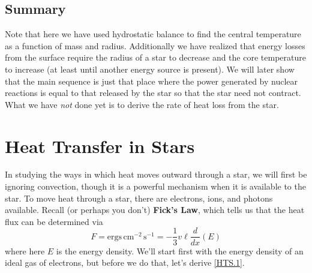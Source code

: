 \documentclass[10pt]{article}
\numberwithin{equation}{section}
\begin{document}
	\subsection{Summary}
		Note that here we have used hydrostatic balance to
                find the central temperature as a function of mass and
                radius. Additionally we have realized that energy
                losses from the surface require the radius of a star
                to decrease and the core temperature to increase (at
                least until another energy source is present). We will
                later show that the main sequence is just that place
                where the power generated by nuclear reactions is
                equal to that released by the star so that the star
                need not contract. What we have \emph{not} done yet is to 
derive the rate of heat loss from the star.
\section{Heat Transfer in Stars}
	In studying the ways in which heat moves outward through a star, we 
will first be ignoring convection, though it is a powerful mechanism when 
it is available to the star. To move heat through a star, there are 
electrons, ions, and photons available. Recall (or perhaps you don't) 
\textbf{Fick's Law}, which tells us that the heat flux can be determined 
via
	\begin{equation}
		\label{HTS.1} F=\mathrm{ergs\,cm^{-2}\,s^{-1}}=-\frac{1}{3}v\ell
\frac{d}{dx}(E)
	\end{equation}
	where here $E$ is the energy density. We'll start first with
        the energy density of an ideal gas of electrons, but before we
        do that, let's derive \eqref{HTS.1}.
\end{document}
